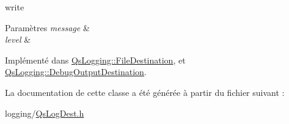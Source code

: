 write 


\begin{DoxyParams}{Paramètres}
{\em message} & \\
\hline
{\em level} & \\
\hline
\end{DoxyParams}


Implémenté dans \hyperlink{classQsLogging_1_1FileDestination_a84b076720ccfa4045e1aacc14c5af5dc}{Qs\-Logging\-::\-File\-Destination}, et \hyperlink{classQsLogging_1_1DebugOutputDestination_a72c60cc3a3f6cb9d63dd88528b7e1125}{Qs\-Logging\-::\-Debug\-Output\-Destination}.



La documentation de cette classe a été générée à partir du fichier suivant \-:\begin{DoxyCompactItemize}
\item 
logging/\hyperlink{QsLogDest_8h}{Qs\-Log\-Dest.\-h}\end{DoxyCompactItemize}
